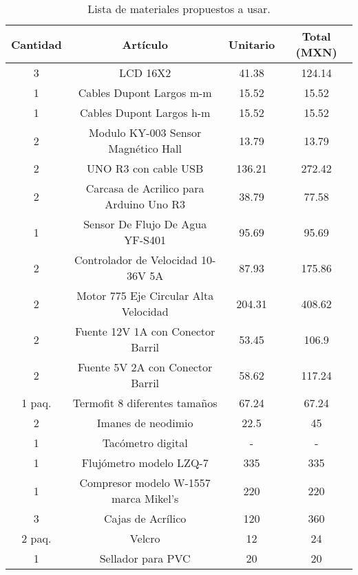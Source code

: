 \documentclass[11pt,letter
								]
								{article}
\begin{document}
\begin{table}[H]
\begin{center}
\caption{Lista de materiales propuestos a usar.  }
 \begin{tabular}{||c c c c||} 
 \hline
 Cantidad & Artículo  & Unitario  & Total (MXN) \\ [0.5ex] 
 \hline\hline
 3 &  LCD 16X2 & 41.38 & 124.14 \\ 
 \hline
 1 & Cables Dupont Largos m-m & 15.52 & 15.52 \\
 \hline
1 & Cables Dupont Largos h-m & 15.52 & 15.52 \\
 \hline
 2 & Modulo KY-003 Sensor Magnético Hall & 13.79 & 13.79 \\
\hline
 2 & UNO R3 con cable USB   & 136.21 & 272.42 \\
\hline
 2 & Carcasa de Acrilico para Arduino Uno R3 & 38.79 & 77.58 \\
\hline
 1 & Sensor De Flujo De Agua YF-S401 & 95.69 &95.69  \\
\hline
 2 & Controlador de Velocidad 10-36V 5A & 87.93 & 175.86 \\

\hline
 2  &  Motor 775 Eje Circular Alta Velocidad & 204.31 & 408.62 \\ 

\hline
 2 &  Fuente 12V 1A con Conector Barril & 53.45& 106.9\\ 
\hline
 2 &  Fuente 5V 2A con Conector Barril & 58.62& 117.24\\ 

\hline
 1 paq. &  Termofit 8 diferentes tamaños & 67.24 & 67.24 \\ 
\hline
 2 &  Imanes de neodimio  &22.5 & 45  \\ 
\hline
 1 &  Tacómetro digital  & -  & - \\ 
\hline
 1 &  Flujómetro  modelo LZQ-7 & 335  & 335\\ 
\hline
 1 &  Compresor modelo W-1557  marca Mikel's & 220 &220 \\ 
\hline
 3 & Cajas de Acrílico & 120 & 360  \\ 
\hline
 2 paq.  & Velcro &12 &24 \\ 
\hline
 1  & Sellador para PVC  &20 &20  \\ 
%
%
%


\end{tabular}
\end{center}
\end{table}
\end{document}
